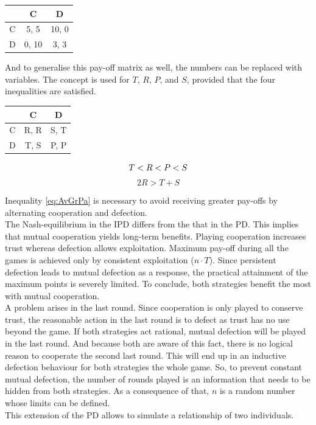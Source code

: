 \documentclass{article}
\begin{document}
\begin{center}
\begin{tabular}{ c|c|c }
   & C & D \\ 
   \hline
 C & 5, 5 & 10, 0\\  
   \hline
 D & 0, 10 & 3, 3
\end{tabular}
\end{center}

And to generalise this pay-off matrix as well, the numbers can be replaced with variables.
The concept is used for $T$, $R$, $P$, and $S$, provided that the four inequalities are satisfied.

\begin{center}
\begin{tabular}{ c|c|c }
   & C & D \\ 
   \hline
 C & R, R & S, T\\  
   \hline
 D & T, S & P, P
\end{tabular}
\end{center}

\begin{equation}
T < R < P < S\\
\end{equation}
\begin{equation}\label{eq:AvGrPa}
2R > T + S
\end{equation}

Inequality \eqref{eq:AvGrPa} is necessary to avoid receiving greater pay-offs by alternating cooperation and defection.\\
The Nash-equilibrium in the IPD differs from the that in the PD.
This implies that mutual cooperation yields long-term benefits.
Playing cooperation increases trust whereas defection allows exploitation.
Maximum pay-off during all the games is achieved only by consistent exploitation ($n \cdot T$).
Since persistent defection leads to mutual defection as a response, the practical attainment of the maximum points is severely limited.
To conclude, both strategies benefit the most with mutual cooperation.\\
A problem arises in the last round.
Since cooperation is only played to conserve trust, the reasonable action in the last round is to defect as trust has no use beyond the game.
If both strategies act rational, mutual defection will be played in the last round.
And because both are aware of this fact, there is no logical reason to cooperate the second last round.
This will end up in an inductive defection behaviour for both strategies the whole game.
So, to prevent constant mutual defection, the number of rounds played is an information that needs to be hidden from both strategies.
As a consequence of that, $n$ is a random number whose limits can be defined.\\
This extension of the PD allows to simulate a relationship of two individuals.
\end{document}
